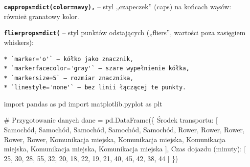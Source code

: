 \documentclass[
  polish,
  letterpaper,
  DIV=11,
  numbers=noendperiod]{scrreprt}
\newenvironment{Shaded}{\begin{snugshade}}{\end{snugshade}}
\newcommand{\CommentTok}[1]{\textcolor[rgb]{0.37,0.37,0.37}{#1}}
\newcommand{\DecValTok}[1]{\textcolor[rgb]{0.68,0.00,0.00}{#1}}
\newcommand{\ImportTok}[1]{\textcolor[rgb]{0.00,0.46,0.62}{#1}}
\newcommand{\NormalTok}[1]{\textcolor[rgb]{0.00,0.23,0.31}{#1}}
\newcommand{\OperatorTok}[1]{\textcolor[rgb]{0.37,0.37,0.37}{#1}}
\newcommand{\StringTok}[1]{\textcolor[rgb]{0.13,0.47,0.30}{#1}}
\begin{document}
\textbf{\texttt{capprops=dict(color=\textquotesingle{}navy\textquotesingle{}),}}
-- styl „czapeczek'' (caps) na końcach wąsów: również granatowy kolor.

\textbf{\texttt{flierprops=dict(}} -- styl punktów odstających
(„fliers'', wartości poza zasięgiem whiskers):

\begin{verbatim}
* `marker='o'` – kółko jako znacznik,
* `markerfacecolor='gray'` – szare wypełnienie kółka,
* `markersize=5` – rozmiar znacznika,
* `linestyle='none'` – bez linii łączącej te punkty.
\end{verbatim}

\begin{Shaded}
\begin{Highlighting}[]
\ImportTok{import}\NormalTok{ pandas }\ImportTok{as}\NormalTok{ pd}
\ImportTok{import}\NormalTok{ matplotlib.pyplot }\ImportTok{as}\NormalTok{ plt}

\CommentTok{\# Przygotowanie danych}
\NormalTok{dane }\OperatorTok{=}\NormalTok{ pd.DataFrame(\{}
    \StringTok{\textquotesingle{}Środek transportu\textquotesingle{}}\NormalTok{: [}
        \StringTok{\textquotesingle{}Samochód\textquotesingle{}}\NormalTok{, }\StringTok{\textquotesingle{}Samochód\textquotesingle{}}\NormalTok{, }\StringTok{\textquotesingle{}Samochód\textquotesingle{}}\NormalTok{, }\StringTok{\textquotesingle{}Samochód\textquotesingle{}}\NormalTok{, }\StringTok{\textquotesingle{}Samochód\textquotesingle{}}\NormalTok{,}
        \StringTok{\textquotesingle{}Rower\textquotesingle{}}\NormalTok{,    }\StringTok{\textquotesingle{}Rower\textquotesingle{}}\NormalTok{,    }\StringTok{\textquotesingle{}Rower\textquotesingle{}}\NormalTok{,    }\StringTok{\textquotesingle{}Rower\textquotesingle{}}\NormalTok{,    }\StringTok{\textquotesingle{}Rower\textquotesingle{}}\NormalTok{,}
        \StringTok{\textquotesingle{}Komunikacja miejska\textquotesingle{}}\NormalTok{, }\StringTok{\textquotesingle{}Komunikacja miejska\textquotesingle{}}\NormalTok{, }\StringTok{\textquotesingle{}Komunikacja miejska\textquotesingle{}}\NormalTok{, }\StringTok{\textquotesingle{}Komunikacja miejska\textquotesingle{}}\NormalTok{, }\StringTok{\textquotesingle{}Komunikacja miejska\textquotesingle{}}
\NormalTok{    ],}
    \StringTok{\textquotesingle{}Czas dojazdu (minuty)\textquotesingle{}}\NormalTok{: [}
        \DecValTok{25}\NormalTok{, }\DecValTok{30}\NormalTok{, }\DecValTok{28}\NormalTok{, }\DecValTok{55}\NormalTok{, }\DecValTok{32}\NormalTok{,}
        \DecValTok{20}\NormalTok{, }\DecValTok{18}\NormalTok{, }\DecValTok{22}\NormalTok{, }\DecValTok{19}\NormalTok{, }\DecValTok{21}\NormalTok{,}
        \DecValTok{40}\NormalTok{, }\DecValTok{45}\NormalTok{, }\DecValTok{42}\NormalTok{, }\DecValTok{38}\NormalTok{, }\DecValTok{44}
\NormalTok{    ]}
\NormalTok{\})}


\end{Highlighting}
\end{Shaded}
\end{document}
